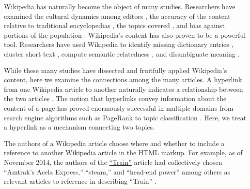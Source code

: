 \documentclass[pre,twocolumn,twoside,superscriptaddress,floatfix]{revtex4-1}
\begin{document}
Wikipedia has naturally become the object of many studies. 
Researchers have examined the cultural dynamics among editors
\cite{iba2010analyzing, samoilenko2016linguistic},
the accuracy of the content relative to traditional encyclopedias
\cite{holman2008comparison, giles2005internet},
the topics covered 
\cite{halavais2008analysis},
and bias against portions of the population
\cite{hill2013wikipedia}.
Wikipedia's content has also proven to be a powerful tool. 
Researchers have used Wikipedia to identify missing dictionary entries
\cite{williams2015identifying},
cluster short text
\cite{banerjee2007clustering},
compute semantic relatedness
\cite{gabrilovich2007computing},
and disambiguate meaning \cite{cucerzan2007large}.

While these many studies have dissected and fruitfully applied Wikipedia's content,
here we examine the connections among the many articles.
A hyperlink from one Wikipedia article to another
naturally indicates a relationship between the two articles
\cite{kamps2009wikipedia}.
The notion that hyperlinks convey information about the content of a
page has proved enormously successful in multiple domains from search engine algorithms 
such as PageRank 
\cite{page1999pagerank} 
to topic classification
\cite{chakrabarti2001integrating}.
Here, we treat a hyperlink as a mechanism connecting two topics.

The authors of a Wikipedia article choose where and whether to include a 
reference to another Wikipedia article
in the HTML markup.
For example, as of November 2014, the authors of the 
\href{https://en.wikipedia.org/wiki/Train}{``Train''}
article
had collectively chosen
``Amtrak's Acela Express,'' ``steam,'' and ``head-end power'' 
among others as relevant articles to reference in describing ``Train''
\cite{wiki_train}
.
\end{document}
